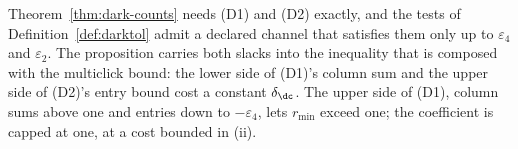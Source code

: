 
Theorem~\ref{thm:dark-counts} needs (D1) and (D2) exactly, and the tests of
Definition~\ref{def:darktol} admit a declared channel that satisfies them only
up to $\varepsilon_4$ and $\varepsilon_2$. The proposition carries both slacks
into the inequality that is composed with the multiclick bound: the lower side
of (D1)'s column sum and the upper side of (D2)'s entry bound cost a constant
$\delta_{\dc}$. The upper side of (D1), column sums above one and entries
down to $-\varepsilon_4$, lets $r_{\min}$ exceed one; the coefficient is
capped at one, at a cost bounded in (ii).

